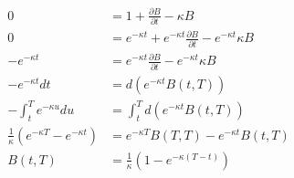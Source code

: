 \begin{align}
   0 &= 1 + \frac{\partial B}{\partial t} - \kappa B \nonumber  \\
   0 &= e^{-\kappa t} + e^{-\kappa t} \frac{\partial B}{\partial t} - e^{-\kappa t} \kappa B \nonumber \\
   -e^{-\kappa t} &= e^{-\kappa t} \frac{\partial B}{\partial t} - e^{-\kappa t} \kappa B  \nonumber \\
   -e^{-\kappa t} dt &= d \left( e^{-\kappa t} B(t, T) \right) \nonumber \\
   - \int_{t}^{T} e^{-\kappa u} du &= \int_{t}^{T} d \left( e^{-\kappa t} B(t, T) \right) \nonumber  \\
   \frac{1}{\kappa} \left( e^{-\kappa T} - e^{-\kappa t} \right) &= e^{-\kappa T} B(T, T) - e^{-\kappa t} B(t, T)\nonumber  \\
   B(t,T) & =\frac{1}{\kappa} \left( 1 - e^{-\kappa (T-t)} \right)  
\end{align}










